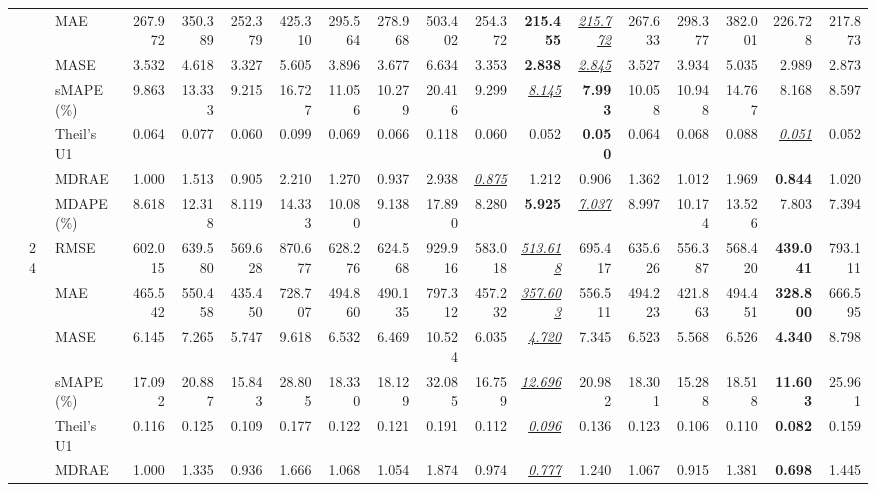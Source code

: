 \begin{table}[!htbp]
{\begin{tabular}{lllrrrrrrrrrrrrrrr}
 &  & MAE & 267.972 & 350.389 & 252.379 & 425.310 & 295.564 & 278.968 & 503.402 & 254.372 & \textbf{215.455} & \underline{\textit{215.772}} & 267.633 & 298.377 & 382.001 & 226.728 & 217.873 \\
 &  & MASE & 3.532 & 4.618 & 3.327 & 5.605 & 3.896 & 3.677 & 6.634 & 3.353 & \textbf{2.838} & \underline{\textit{2.845}} & 3.527 & 3.934 & 5.035 & 2.989 & 2.873 \\
 &  & sMAPE (\%) & 9.863 & 13.333 & 9.215 & 16.727 & 11.056 & 10.279 & 20.416 & 9.299 & \underline{\textit{8.145}} & \textbf{7.993} & 10.058 & 10.948 & 14.767 & 8.168 & 8.597 \\
 &  & Theil's U1 & 0.064 & 0.077 & 0.060 & 0.099 & 0.069 & 0.066 & 0.118 & 0.060 & 0.052 & \textbf{0.050} & 0.064 & 0.068 & 0.088 & \underline{\textit{0.051}} & 0.052 \\
 &  & MDRAE & 1.000 & 1.513 & 0.905 & 2.210 & 1.270 & 0.937 & 2.938 & \underline{\textit{0.875}} & 1.212 & 0.906 & 1.362 & 1.012 & 1.969 & \textbf{0.844} & 1.020 \\
 &  & MDAPE (\%) & 8.618 & 12.318 & 8.119 & 14.333 & 10.080 & 9.138 & 17.890 & 8.280 & \textbf{5.925} & \underline{\textit{7.037}} & 8.997 & 10.174 & 13.526 & 7.803 & 7.394 \\
\cmidrule(lr){2-18}
 & 24 & RMSE & 602.015 & 639.580 & 569.628 & 870.677 & 628.276 & 624.568 & 929.916 & 583.018 & \underline{\textit{513.618}} & 695.417 & 635.626 & 556.387 & 568.420 & \textbf{439.041} & 793.111 \\
 &  & MAE & 465.542 & 550.458 & 435.450 & 728.707 & 494.860 & 490.135 & 797.312 & 457.232 & \underline{\textit{357.603}} & 556.511 & 494.223 & 421.863 & 494.451 & \textbf{328.800} & 666.595 \\
 &  & MASE & 6.145 & 7.265 & 5.747 & 9.618 & 6.532 & 6.469 & 10.524 & 6.035 & \underline{\textit{4.720}} & 7.345 & 6.523 & 5.568 & 6.526 & \textbf{4.340} & 8.798 \\
 &  & sMAPE (\%) & 17.092 & 20.887 & 15.843 & 28.805 & 18.330 & 18.129 & 32.085 & 16.759 & \underline{\textit{12.696}} & 20.982 & 18.301 & 15.288 & 18.518 & \textbf{11.603} & 25.961 \\
 &  & Theil's U1 & 0.116 & 0.125 & 0.109 & 0.177 & 0.122 & 0.121 & 0.191 & 0.112 & \underline{\textit{0.096}} & 0.136 & 0.123 & 0.106 & 0.110 & \textbf{0.082} & 0.159 \\
 &  & MDRAE & 1.000 & 1.335 & 0.936 & 1.666 & 1.068 & 1.054 & 1.874 & 0.974 & \underline{\textit{0.777}} & 1.240 & 1.067 & 0.915 & 1.381 & \textbf{0.698} & 1.445 \\

\end{tabular}}
\end{table}
